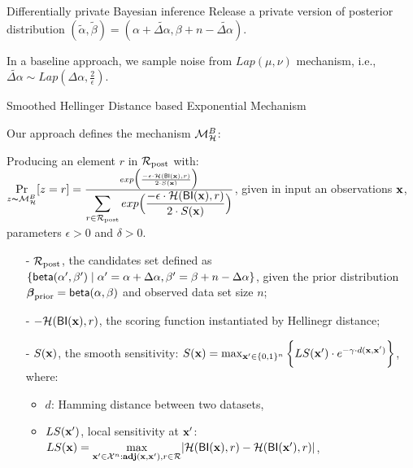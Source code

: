 \documentclass[final,hyperref={pdfpagelabels=false}]{beamer}
\begin{document}
\begin{frame}[t]
\begin{columns}[t]
\begin{column}{.485\textwidth}
\begin{block}{Differentially private Bayesian inference}
Release a private version of posterior distribution $(\tilde\alpha,\tilde\beta)=(\alpha +  \widetilde{\Delta \alpha},\beta + n - \widetilde{\Delta \alpha})$.

In a baseline approach, we sample noise from $Lap(\mu,\nu)$ mechanism, i.e., $\widetilde{\Delta \alpha}\sim Lap(\Delta \alpha, \frac{2}{\epsilon})$.

\end{block}



\begin{block}{Smoothed Hellinger Distance based Exponential Mechanism}

Our approach defines the mechanism $\mathcal{M}^{B}_{\mathcal{H}}$:

Producing an element $r$ in $\mathcal{R}_{\textup{post}}$ with:
$
\underset{z \thicksim \mathcal{M}^{B}_{\mathcal{H}}}{\Pr}[z=r] = 
\frac 
{exp\Big(\frac{-\epsilon\cdot\mathcal{H}(\mathsf{BI}(\textbf{x}),r)}{2\cdot S(\textbf{x})}\Big)}
{\displaystyle\sum_{r\in\mathcal{R}_{\textup{post}}} exp\Big(\frac{-\epsilon\cdot\mathcal{H}(\mathsf{BI}(\textbf{x}),r)}{2\cdot S(\textbf{x})}\Big)}
$,
given in input an observations $\textbf{x}$, parameters $\epsilon>0$ and $\delta>0$.

\begin{itemize}
  \item[-] $\mathcal{R}_{\textup{post}}$, the candidates set defined as $\{\mathsf{beta}(\alpha',\beta')\mid \alpha'=\alpha+\Delta\alpha, \beta'=\beta+n-\Delta\alpha\}$, given the prior distribution $\boldsymbol{\beta}_{\textup{prior}}=\mathsf{beta}(\alpha, \beta)$ and observed data set size $n$;

  \item[-] $-\mathcal{H}(\mathsf{BI}(\textbf{x}),r)$, the scoring function instantiated by Hellinegr distance;

  \item[-] $S(\textbf{x})$, the smooth sensitivity:
  $
  S(\textbf{x})=\max_{\textbf{x}' \in \{0,1\}^{n}}\bigg \{LS(\textbf{x}') \cdot e^{-\gamma\cdot d(\textbf{x},\textbf{x}')}\bigg\}
  $,
  where:
  \begin{itemize}
   \item $d$: Hamming distance between two datasets, 

   \item $LS(\textbf{x}')$, local sensitivity at $\textbf{x}'$:
   $
   LS(\textbf{x})=\max\limits_{\textbf{x}' \in \mathcal{X}^n:\textbf{adj}(\textbf{x},\textbf{x}'), r\in \mathcal{R}}\lvert \mathcal{H}(\mathsf{BI}(\textbf{x}), r) - \mathcal{H}(\mathsf{BI}(\textbf{x}'), r)\rvert
   $,


\end{itemize}
\end{itemize}
\end{block}
\end{column}
\end{columns}
\end{frame}
\end{document}
